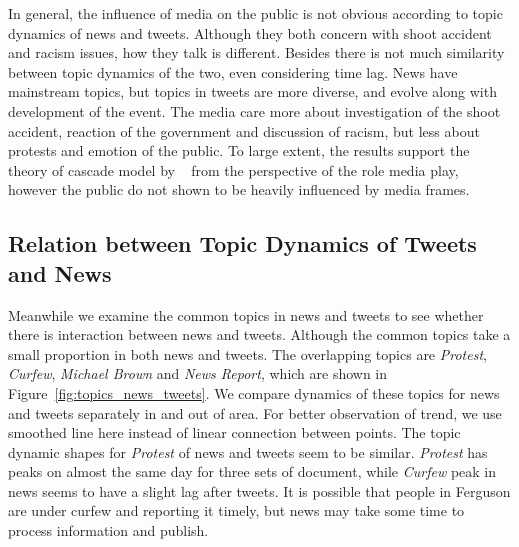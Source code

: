 In general, the influence of media on the public is not obvious according to topic dynamics of news and tweets. Although they both concern with shoot accident and racism issues, how they talk is different. Besides there is not much similarity between topic dynamics of the two, even considering time lag. News have mainstream topics, but topics in tweets are more diverse, and evolve along with development of the event. The media care more about investigation of the shoot accident, reaction of the government and discussion of racism, but less about protests and emotion of the public. To large extent, the results support the theory of cascade model by ~ from the perspective of the role media play, however the public do not shown to be heavily influenced by media frames. 

\subsection{Relation between Topic Dynamics of Tweets and News}
Meanwhile we examine the common topics in news and tweets to see whether there is interaction between news and tweets. Although the common topics take a small proportion in both news and tweets. The overlapping topics are \emph{Protest}, \emph{Curfew}, \emph{Michael Brown} and \emph{News Report}, which are shown in Figure~\ref{fig:topics_news_tweets}. We compare dynamics of these topics for news and tweets separately in and out of \stlouis area. For better observation of trend, we use smoothed line here instead of linear connection between points. The topic dynamic shapes for \emph{Protest} of news and tweets seem to be similar. \emph{Protest} has peaks on almost the same day for three sets of document, while \emph{Curfew} peak in news seems to have a slight lag after tweets. It is possible that people in Ferguson are under curfew and reporting it timely, but news may take some time to process information and publish.


